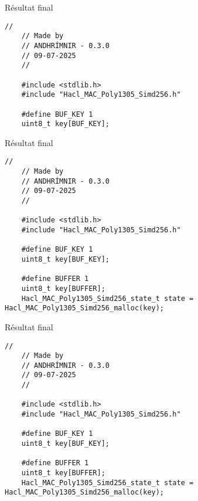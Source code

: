 \documentclass[A4,svgnames,9pt,aspectratio=169]{beamer}
\begin{document}


\begin{frame}[fragile]{Résultat final}
  \begin{lstlisting}[style=CStyle, gobble=4, caption={Hacl\_MAC\_Poly1305\_Simd256\_reset.c}]
    //
    // Made by
    // ANDHRÍMNIR - 0.3.0
    // 09-07-2025
    //

    #include <stdlib.h>
    #include "Hacl_MAC_Poly1305_Simd256.h"

    #define BUF_KEY 1
    uint8_t key[BUF_KEY];
  \end{lstlisting}

\end{frame}



\begin{frame}[fragile]{Résultat final}
  \begin{lstlisting}[style=CStyle, gobble=4, caption={Hacl\_MAC\_Poly1305\_Simd256\_reset.c}]
    //
    // Made by
    // ANDHRÍMNIR - 0.3.0
    // 09-07-2025
    //

    #include <stdlib.h>
    #include "Hacl_MAC_Poly1305_Simd256.h"

    #define BUF_KEY 1
    uint8_t key[BUF_KEY];
    
    #define BUFFER 1
    uint8_t key[BUFFER];
    Hacl_MAC_Poly1305_Simd256_state_t state = Hacl_MAC_Poly1305_Simd256_malloc(key);
  \end{lstlisting}

\end{frame}



\begin{frame}[fragile]{Résultat final}
  \begin{lstlisting}[style=CStyle, gobble=4, caption={Hacl\_MAC\_Poly1305\_Simd256\_reset.c}]
    //
    // Made by
    // ANDHRÍMNIR - 0.3.0
    // 09-07-2025
    //

    #include <stdlib.h>
    #include "Hacl_MAC_Poly1305_Simd256.h"

    #define BUF_KEY 1
    uint8_t key[BUF_KEY];
        
    #define BUFFER 1
    uint8_t key[BUFFER];
    Hacl_MAC_Poly1305_Simd256_state_t state = Hacl_MAC_Poly1305_Simd256_malloc(key);
  \end{lstlisting}

\end{frame}
\end{document}
